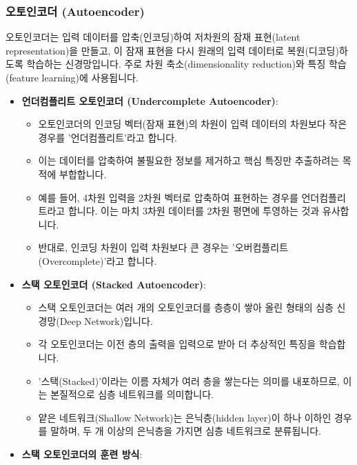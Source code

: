 \documentclass[11pt,a4paper]{article}
\theoremstyle{definition}
\begin{document}
\subsubsection*{오토인코더 (Autoencoder)}
\begin{infobox} %
오토인코더는 입력 데이터를 압축(인코딩)하여 저차원의 잠재 표현(latent representation)을 만들고, 이 잠재 표현을 다시 원래의 입력 데이터로 복원(디코딩)하도록 학습하는 신경망입니다.
주로 차원 축소(dimensionality reduction)와 특징 학습(feature learning)에 사용됩니다.
\end{infobox}

\begin{itemize}
    \item \textbf{언더컴플리트 오토인코더 (Undercomplete Autoencoder)}:
    \begin{itemize}
        \item 오토인코더의 인코딩 벡터(잠재 표현)의 차원이 입력 데이터의 차원보다 작은 경우를 '언더컴플리트'라고 합니다.
        \item 이는 데이터를 압축하여 불필요한 정보를 제거하고 핵심 특징만 추출하려는 목적에 부합합니다.
        \item 예를 들어, 4차원 입력을 2차원 벡터로 압축하여 표현하는 경우를 언더컴플리트라고 합니다. 이는 마치 3차원 데이터를 2차원 평면에 투영하는 것과 유사합니다.
        \item 반대로, 인코딩 차원이 입력 차원보다 큰 경우는 '오버컴플리트(Overcomplete)'라고 합니다.
    \end{itemize}
    \item \textbf{스택 오토인코더 (Stacked Autoencoder)}:
    \begin{itemize}
        \item 스택 오토인코더는 여러 개의 오토인코더를 층층이 쌓아 올린 형태의 심층 신경망(Deep Network)입니다.
        \item 각 오토인코더는 이전 층의 출력을 입력으로 받아 더 추상적인 특징을 학습합니다.
        \item '스택(Stacked)'이라는 이름 자체가 여러 층을 쌓는다는 의미를 내포하므로, 이는 본질적으로 심층 네트워크를 의미합니다.
        \item 얕은 네트워크(Shallow Network)는 은닉층(hidden layer)이 하나 이하인 경우를 말하며, 두 개 이상의 은닉층을 가지면 심층 네트워크로 분류됩니다.
    \end{itemize}
    \item \textbf{스택 오토인코더의 훈련 방식}:
    \begin{itemize}

\end{itemize}
\end{itemize}
\end{document}
